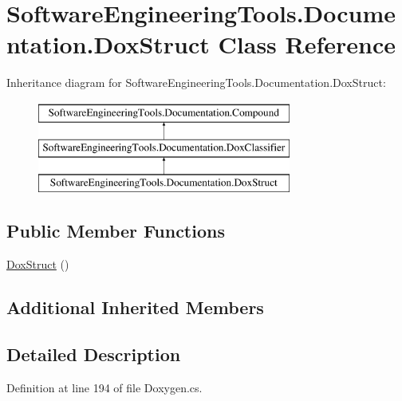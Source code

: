 \hypertarget{class_software_engineering_tools_1_1_documentation_1_1_dox_struct}{\section{Software\+Engineering\+Tools.\+Documentation.\+Dox\+Struct Class Reference}
\label{class_software_engineering_tools_1_1_documentation_1_1_dox_struct}
}
Inheritance diagram for Software\+Engineering\+Tools.\+Documentation.\+Dox\+Struct\+:\begin{figure}[H]
\begin{center}
\leavevmode
\includegraphics[height=3.000000cm]{class_software_engineering_tools_1_1_documentation_1_1_dox_struct}
\end{center}
\end{figure}
\subsection*{Public Member Functions}
\begin{DoxyCompactItemize}
\item 
\hyperlink{class_software_engineering_tools_1_1_documentation_1_1_dox_struct_a0db064c36b5dbedc8693c6965f6f405a}{Dox\+Struct} ()
\end{DoxyCompactItemize}
\subsection*{Additional Inherited Members}


\subsection{Detailed Description}


Definition at line 194 of file Doxygen.\+cs.



